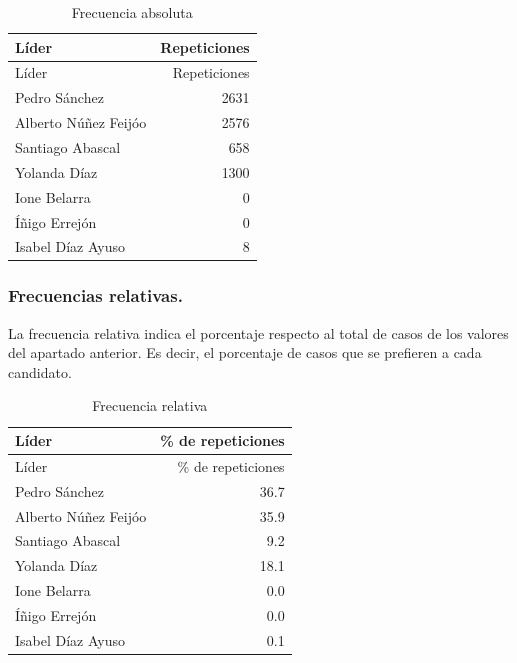 \documentclass[
  12 pt,
  a4paper,
]{article}
\newenvironment{Shaded}{\begin{snugshade}}{\end{snugshade}}
\newcommand{\AttributeTok}[1]{\textcolor[rgb]{0.13,0.29,0.53}{#1}}
\newcommand{\DecValTok}[1]{\textcolor[rgb]{0.00,0.00,0.81}{#1}}
\newcommand{\FunctionTok}[1]{\textcolor[rgb]{0.13,0.29,0.53}{\textbf{#1}}}
\newcommand{\NormalTok}[1]{#1}
\newcommand{\SpecialCharTok}[1]{\textcolor[rgb]{0.81,0.36,0.00}{\textbf{#1}}}
\newcommand{\StringTok}[1]{\textcolor[rgb]{0.31,0.60,0.02}{#1}}
\begin{document}
\begin{longtable}[]{@{}lr@{}}
\caption{Frecuencia absoluta}\tabularnewline
\toprule\noalign{}
Líder & Repeticiones \\
\midrule\noalign{}
\endfirsthead
\toprule\noalign{}
Líder & Repeticiones \\
\midrule\noalign{}
\endhead
\bottomrule\noalign{}
\endlastfoot
Pedro Sánchez & 2631 \\
Alberto Núñez Feijóo & 2576 \\
Santiago Abascal & 658 \\
Yolanda Díaz & 1300 \\
Ione Belarra & 0 \\
Íñigo Errejón & 0 \\
Isabel Díaz Ayuso & 8 \\
\end{longtable}

\hypertarget{frecuencias-relativas.}{%
\subsubsection{Frecuencias relativas.}\label{frecuencias-relativas.}}

La frecuencia relativa indica el porcentaje respecto al total de casos
de los valores del apartado anterior. Es decir, el porcentaje de casos
que se prefieren a cada candidato.

\begin{Shaded}
\end{Shaded}

\begin{longtable}[]{@{}lr@{}}
\caption{Frecuencia relativa}\tabularnewline
\toprule\noalign{}
Líder & \% de repeticiones \\
\midrule\noalign{}
\endfirsthead
\toprule\noalign{}
Líder & \% de repeticiones \\
\midrule\noalign{}
\endhead
\bottomrule\noalign{}
\endlastfoot
Pedro Sánchez & 36.7 \\
Alberto Núñez Feijóo & 35.9 \\
Santiago Abascal & 9.2 \\
Yolanda Díaz & 18.1 \\
Ione Belarra & 0.0 \\
Íñigo Errejón & 0.0 \\
Isabel Díaz Ayuso & 0.1 \\
\end{longtable}
\end{document}
